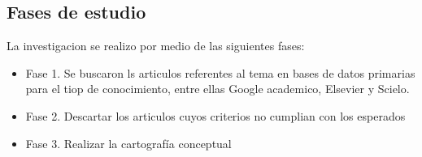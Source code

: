 \subsection{Fases de estudio}

La investigacion se realizo por medio de las siguientes fases:

\begin{itemize}
   \item Fase 1. Se buscaron ls articulos referentes al tema en bases de datos primarias para el tiop de conocimiento, entre ellas Google academico, Elsevier y Scielo.
   \item Fase 2. Descartar los articulos cuyos criterios no cumplian con los esperados
      
   \item Fase 3. Realizar la cartografía conceptual
\end{itemize}

%

